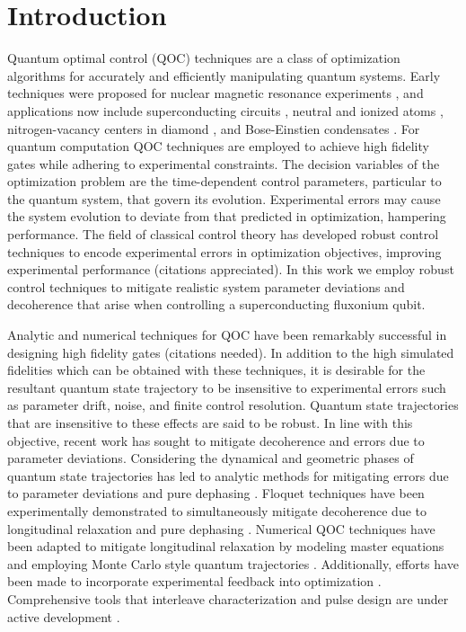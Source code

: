 \section{Introduction}
Quantum optimal control (QOC) techniques are a class of optimization
algorithms for accurately and efficiently manipulating quantum systems.
Early techniques were proposed for nuclear magnetic resonance experiments
\cite{khaneja2005optimal}, and applications now include superconducting
circuits \cite{heeres2017implementing,
  huang2020engineering, leng2019robust, leung2017speedup, xu2020nonadiabatic},
neutral and ionized atoms \cite{van2016optimal}, nitrogen-vacancy centers in
diamond \cite{rembold2020introduction}, and Bose-Einstien condensates
\cite{sorensen2018quantum}. For quantum computation
QOC techniques are employed to achieve high fidelity gates
while adhering to experimental constraints.
The decision variables of the optimization problem are the time-dependent control
parameters, particular to the quantum system, that govern its evolution.
Experimental errors may cause the system evolution to deviate from that predicted in
optimization, hampering performance.
The field of classical control theory has developed robust control techniques
to encode experimental errors in optimization objectives, improving
experimental performance (citations appreciated).
In this work we employ robust control techniques to mitigate
realistic system parameter deviations and decoherence that arise when controlling
a superconducting fluxonium qubit.

Analytic and numerical techniques for QOC have been remarkably successful in
designing high fidelity gates (citations needed). In addition to the high
simulated fidelities which can be obtained with these techniques, it is desirable for the
resultant quantum state trajectory to be insensitive to experimental errors
such as parameter drift, noise, and finite control resolution. Quantum state
trajectories that are insensitive to these effects are said to be robust.
In line with this objective, recent work has sought to mitigate decoherence
and errors due to parameter deviations.
Considering the dynamical and geometric phases of quantum state
trajectories has led to analytic methods for mitigating
errors due to parameter deviations and pure dephasing
\cite{han2020experimental, merrill2014progress, xu2020nonadiabatic, zhang2020universal}.
Floquet techniques have been experimentally demonstrated to simultaneously mitigate
decoherence due to longitudinal relaxation and pure dephasing
\cite{huang2020engineering, mundada2020floquet}.
Numerical QOC techniques have been adapted to mitigate longitudinal relaxation
by modeling master equations \cite{rembold2020introduction} and employing
Monte Carlo style quantum trajectories \cite{abdelhafez2019gradient}.
Additionally, efforts have been made to incorporate experimental feedback
into optimization \cite{huang2020engineering}. Comprehensive tools that interleave characterization
and pulse design are under active development \cite{wittler2020integrated}.

